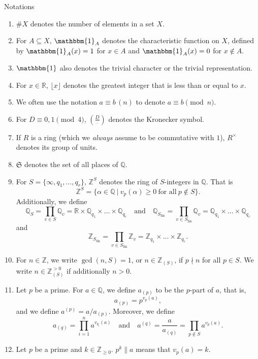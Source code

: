 \documentclass[10pt,oneside,reqno]{amsart}
\makeatletter
\newcommand\QQ{\mathbb{Q}}
\newcommand\RR{\mathbb{R}}
\newcommand\ZZ{\mathbb{Z}}
\newcommand\mf[1]{\mathfrak{#1}}
\newcommand\triv{\mathbbm{1}}
\newcommand\fin{\mathrm{fin}}
\renewcommand\geq{\geqslant}
\newcommand\legendresymbol[2]{\genfrac{(}{)}{}{}{#1}{#2}}
\def\subsection{\@startsection{subsection}{2}%
  \z@{3pt\@plus0pt}{-.5em}%
  {\normalfont\bfseries}}
\theoremstyle{THEOREM}
\theoremstyle{DEFINITION}
\theoremstyle{EXERCISE}
\numberwithin{equation}{section}
\makeatother
\begin{document}
\subsection{Notations}
\begin{enumerate}[itemsep=0pt,parsep=0pt,topsep=0pt,leftmargin=0pt,labelsep=3pt,itemindent=9pt,label=\textbullet]
  \item $\# X$ denotes the number of elements in a set $X$.
  \item For $A\subseteq X$, $\triv_A$ denotes the characteristic function on $X$, defined by $\triv_A(x)=1$ for $x\in A$ and $\triv_A(x)=0$ for $x\notin A$.
  \item $\triv$ also denotes the trivial character or the trivial representation.
  \item For $x\in \RR$, $\lfloor x\rfloor$ denotes the greatest integer that is less than or equal to $x$.
  \item We often use the notation $a\equiv b\,(n)$ to denote $a\equiv b\pmod n$.
  \item For $D\equiv 0,1\pmod 4$, $\legendresymbol{D}{\cdot}$ denotes the Kronecker symbol.
  \item If $R$ is a ring (which we \emph{always} assume to be commutative with $1$), $R^\times$ denotes its group of units.  
  \item $\mf{S}$ denotes the set of all places of $\QQ$.
  \item For $S=\{\infty, q_1,\dots,q_r\}$, $\ZZ^S$ denotes the ring of $S$-integers in $\QQ$. That is
    \[
    \ZZ^S=\{\alpha\in \QQ\ |\ v_p(\alpha)\geq 0\ \text{for all}\ p\notin S\}.
    \]
    Additionally, we define
    \[
    \QQ_S=\prod_{v\in S}\QQ_v=\RR\times \QQ_{q_1}\times\dots\times\QQ_{q_r}\quad\text{and}\quad\QQ_{S_\fin}=\prod_{v\in S_\fin}\QQ_v=\QQ_{q_1}\times\dots\times\QQ_{q_r}
    \]
  and
    \[
    \ZZ_{S_\fin}=\prod_{v\in S_\fin}\ZZ_v=\ZZ_{q_1}\times\dots\times\ZZ_{q_r}.
    \]
  \item For $n\in \ZZ$, we write $\gcd(n,S)=1$, or $n\in \ZZ_{(S)}$, if 
  $p\nmid n$ for all $p\in S$. 
  We write $n\in \ZZ_{(S)}^{>0}$ if additionally $n>0$.
  \item Let $p$ be a prime. For $a\in\QQ$, we define $a_{(p)}$ to be the $p$-part of $a$, that is, 
\[
a_{(p)}=p^{v_p(a)},
\]
and we define $a^{(p)}=a/a_{(p)}$.
Moreover, we define 
  \[
    a_{(q)}=\prod_{i=1}^{n}a^{v_{q_i}(a)}\quad\text{and}\quad a^{(q)}=\frac{a}{a_{(q)}}=\prod_{p\notin S}a^{v_{p}(a)}.
  \]
  \item Let $p$ be a prime and $k\in \ZZ_{\geq 0}$. $p^k\parallel a$ means that $v_p(a)=k$.

\end{enumerate}
\end{document}
